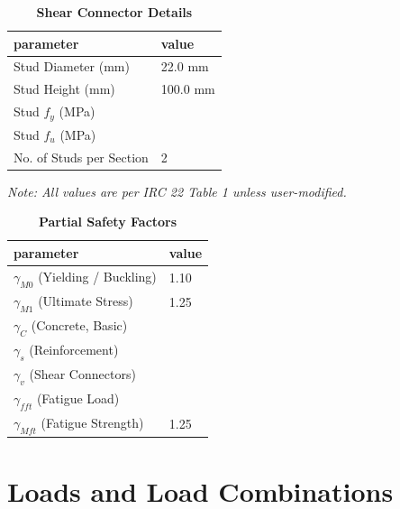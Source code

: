 \documentclass[12pt,a4paper]{report}
\numberwithin{table}{chapter}
\numberwithin{figure}{chapter}
\begin{document}
\label{subsec:shear-connectors}

\vspace{2.2em}

\vspace{0.4em}
\begin{longtable}{|L{5.5cm}|p{10.0cm}|}
\caption{\textbf{Shear Connector Details}}
\hline
\textbf{parameter} & \textbf{value} \\
\hline
\textnormal{Stud Diameter (mm)} & 22.0 mm \\[6pt]
\hline
\textnormal{Stud Height (mm)} & 100.0 mm \\[6pt]
\hline
\textnormal{Stud $f_y$ (MPa)} &  \\[6pt]
\hline
\textnormal{Stud $f_u$ (MPa)} &  \\[6pt]
\hline
\textnormal{No. of Studs per Section} & 2 \\[6pt]
\hline
\end{longtable}



\label{subsec:safety-factors}

\vspace{2.2em}

\vspace{0.3em}
\noindent\textit{Note: All values are per IRC 22 Table 1 unless user-modified.}

\vspace{0.4em}
\begin{longtable}{|L{5.5cm}|p{10.0cm}|}
\caption{\textbf{Partial Safety Factors}}
\hline
\textbf{parameter} & \textbf{value} \\
\hline
\textnormal{$\gamma_{M0}$ (Yielding / Buckling)} & 1.10 \\[6pt]
\hline
\textnormal{$\gamma_{M1}$ (Ultimate Stress)} & 1.25 \\[6pt]
\hline
\textnormal{$\gamma_C$ (Concrete, Basic)} &  \\[6pt]
\hline
\textnormal{$\gamma_s$ (Reinforcement)} &  \\[6pt]
\hline
\textnormal{$\gamma_v$ (Shear Connectors)} &  \\[6pt]
\hline
\textnormal{$\gamma_{fft}$ (Fatigue Load)} &  \\[6pt]
\hline
\textnormal{$\gamma_{Mft}$ (Fatigue Strength)} & 1.25 \\[6pt]
\hline
\end{longtable}


\chapter{Loads and Load Combinations}
\end{document}
